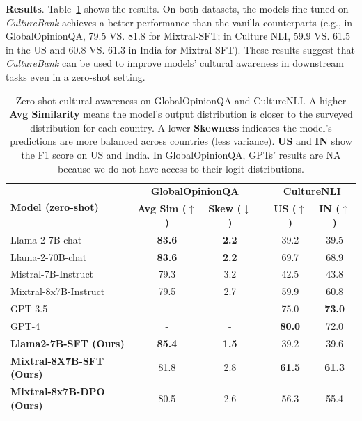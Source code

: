 \documentclass{article} %
\newcommand{\dataname}{\textit{CultureBank}\xspace}
\begin{document}
\noindent\textbf{Results}. Table~\ref{tab: downstream tasks} shows the results. %
On both datasets, the models fine-tuned on \dataname achieves a better performance than the vanilla counterparts (e.g., in GlobalOpinionQA, 79.5 VS. 81.8 for Mixtral-SFT; in Culture NLI, 59.9 VS. 61.5 in the US and 60.8 VS. 61.3 in India for Mixtral-SFT).
These results suggest that \dataname can be used to improve models' cultural awareness in downstream tasks even in a zero-shot setting.  

\begin{table}[h]
\centering
\begin{tabular}{ lccccc}
 \toprule
\multirow{2}{*}{\textbf{Model (zero-shot)}} &  \multicolumn{2}{c}{\textbf{GlobalOpinionQA}} & \hspace{0.5pt} &  \multicolumn{2}{c}{\textbf{CultureNLI}} \\
\cmidrule{2-3} \cmidrule{5-6}
 & \textbf{Avg Sim ($\uparrow$)} & \textbf{Skew ($\downarrow$)}&& \textbf{US ($\uparrow$)} & \textbf{IN ($\uparrow$)} \\
 \midrule
 \midrule
 Llama-2-7B-chat & \textbf{83.6}&\textbf{2.2}&& 39.2 & 39.5 \\
 \midrule
 Llama-2-70B-chat & \textbf{83.6}&\textbf{2.2}&& 69.7 & 68.9 \\
 \midrule
 Mistral-7B-Instruct & 79.3&3.2&& 42.5 & 43.8\\
 \midrule
 Mixtral-8x7B-Instruct &79.5&2.7&& 59.9 & 60.8\\
 \midrule
GPT-3.5 &-&-&& 75.0 & \textbf{73.0} \\
 \midrule
 GPT-4 & -&-&& \textbf{80.0} & 72.0 \\
 \midrule
 \midrule
 \textbf{Llama2-7B-SFT (Ours)} & \textbf{85.4} & \textbf{1.5}& & 39.2 & 39.6 \\
 \midrule
 \textbf{Mixtral-8X7B-SFT (Ours)} & 81.8 %
 &2.8&& \textbf{61.5} & \textbf{61.3} \\
 \midrule
 \textbf{Mixtral-8x7B-DPO (Ours)} & 80.5&2.6&& 56.3 & 55.4 \\
 \bottomrule
\end{tabular}
\caption{\label{tab: downstream tasks} Zero-shot cultural awareness on GlobalOpinionQA and CultureNLI. A higher \textbf{Avg Similarity} means the model's output distribution is closer to the surveyed distribution for each country. A lower \textbf{Skewness} indicates the model's predictions are more balanced across countries (less variance). \textbf{US} and \textbf{IN} show the F1 score on US and India. In GlobalOpinionQA, GPTs' results are NA because we do not have access to their logit distributions. %
}
\end{table}
\end{document}
